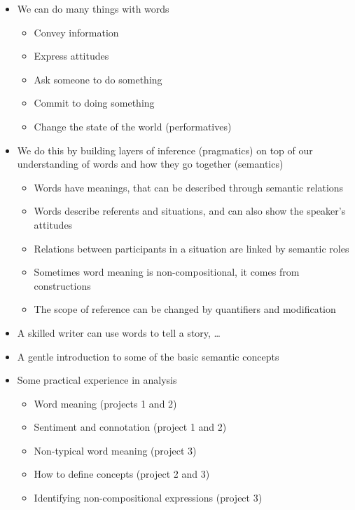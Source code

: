 \documentclass[a4paper,landscape,headrule,footrule,xetex]{foils}
\begin{document}
\begin{itemize}
\item We can do many things with words
  \begin{itemize}
  \item Convey information
  \item Express attitudes
  \item Ask someone to do something
  \item Commit to doing something
  \item Change the state of the world (performatives)
  \end{itemize}
\newpage
\item We do this by building layers of inference (pragmatics) on top
  of our understanding of words and how they go together (semantics)
  \begin{itemize}
  \item Words have meanings, that can be described through semantic relations
  \item Words describe referents and situations, and can also show the
    speaker's attitudes
  \item Relations between participants in a situation are linked by semantic roles
  \item Sometimes word meaning is non-compositional, it comes from constructions
  \item The scope of reference can be changed by quantifiers and modification
  \end{itemize}
\item A skilled writer can use words to tell a story, \ldots
\end{itemize}


\begin{itemize}
\item A gentle introduction to some of the basic semantic concepts
\item Some practical experience in analysis
  \begin{itemize}
  \item Word meaning (projects 1 and 2)
  \item Sentiment and connotation (project 1 and 2)
  \item Non-typical word meaning (project 3)
  \item How to define concepts (project 2 and 3)
  \item Identifying non-compositional expressions (project 3)
  \end{itemize}
\end{itemize}
\end{document}
